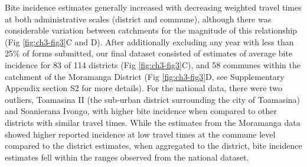 \documentclass[
  oneside]{book}
\begin{document}
Bite incidence estimates generally increased with decreasing weighted
travel times at both administrative scales (district and commune),
although there was considerable variation between catchments for the
magnitude of this relationship (Fig \ref{fig:ch3-fig3}C and D). After additionally
excluding any year with less than 25\% of forms submitted, our final
dataset consisted of estimates of average bite incidence for 83 of 114
districts (Fig \ref{fig:ch3-fig3}C), and 58 communes within the catchment of the
Moramanga District (Fig \ref{fig:ch3-fig3}D, see Supplementary Appendix section S2 for
more details). For the national data, there were two outliers, Toamasina
II (the sub-urban district surrounding the city of Toamasina) and
Soanierana Ivongo, with higher bite incidence when compared to other
districts with similar travel times. While the estimates from the
Moramanga data showed higher reported incidence at low travel times at
the commune level compared to the district estimates, when aggregated to
the district, bite incidence estimates fell within the ranges observed
from the national dataset.
\end{document}
